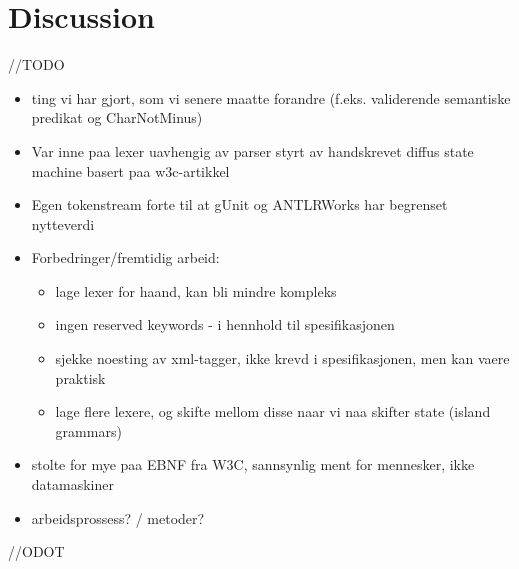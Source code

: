 \chapter{Discussion}

//TODO

\begin{itemize}
\item ting vi har gjort, som vi senere maatte forandre (f.eks. validerende semantiske predikat og CharNotMinus)
\item Var inne paa lexer uavhengig av parser styrt av handskrevet diffus state machine basert paa w3c-artikkel
\item Egen tokenstream forte til at gUnit og ANTLRWorks har begrenset nytteverdi
\item Forbedringer/fremtidig arbeid:
\begin{itemize}
\item lage lexer for haand, kan bli mindre kompleks
\item ingen reserved keywords - i hennhold til spesifikasjonen
\item sjekke noesting av xml-tagger, ikke krevd i spesifikasjonen, men kan vaere praktisk
\item lage flere lexere, og skifte mellom disse naar vi naa skifter state
(island grammars)
\end{itemize}
\item stolte for mye paa EBNF fra W3C, sannsynlig ment for mennesker, ikke datamaskiner
\item arbeidsprossess? / metoder?
\end{itemize}


//ODOT